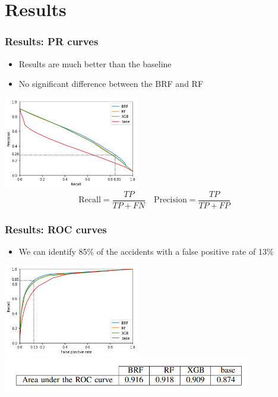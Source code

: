 \documentclass[slidestop,compress,red,mathserif]{beamer}
\begin{document}
\section{Results}

\begin{frame}
	\frametitle{Results: PR curves}
	\begin{itemize}
		\item Results are much better than the baseline
		\item No significant difference between the BRF and RF
	\end{itemize}
\centering
\includegraphics[height=4cm, keepaspectratio]{Figures/pr.png}
\begin{equation*}
  \mathrm{Recall} = \frac{TP}{TP+FN} \quad  \mathrm{Precision} = \frac{TP}{TP+FP}
\end{equation*}
\end{frame}

\begin{frame}
	\frametitle{Results: ROC curves}
	\begin{itemize}
     \item We can identify 85\% of the accidents with a false positive rate of 13\%
	\end{itemize}
\centering
\includegraphics[height=4cm, keepaspectratio]{Figures/roc.png}
\hspace*{-1cm}\includegraphics[height=1.5cm, keepaspectratio]{Figures/results_table.png}
\end{frame}
\end{document}
